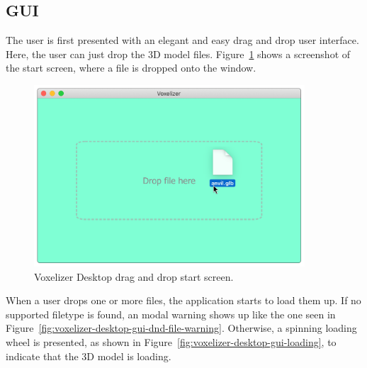 \subsection{GUI}
The user is first presented with an elegant and easy drag and drop user interface. Here, the user can just drop the 3D model files. Figure~\ref{fig:voxelizer-desktop-gui-dnd} shows a screenshot of the start screen, where a file is dropped onto the window.
\begin{figure}[htp]
    \centering
    \includegraphics[width=0.9\textwidth]{sections/result/figures/voxelizer-desktop-gui-dnd.png}
    \caption{Voxelizer Desktop drag and drop start screen.}
    \label{fig:voxelizer-desktop-gui-dnd}
\end{figure}

When a user drops one or more files, the application starts to load them up. If no supported filetype is found, an modal warning shows up like the one seen in Figure~\ref{fig:voxelizer-desktop-gui-dnd-file-warning}. Otherwise, a spinning loading wheel is presented, as shown in Figure~\ref{fig:voxelizer-desktop-gui-loading}, to indicate that the 3D model is loading.

